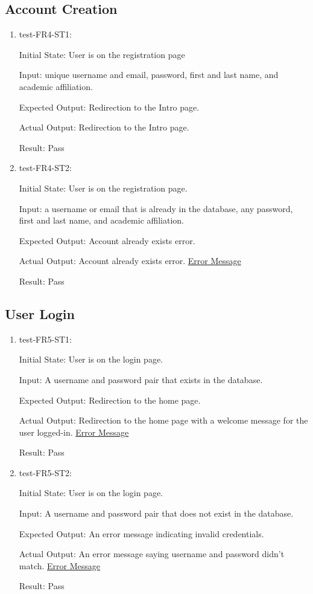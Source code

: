 \documentclass[12pt, titlepage]{article}
\begin{document}
\subsection{Account Creation}
\begin{enumerate}
    \item test-FR4-ST1:\label{test-FR4-ST1}
    
    Initial State: User is on the registration page
    
    Input: unique username and email, password, first and last name, and academic affiliation.
    
    Expected Output: Redirection to the Intro page.
    
    Actual Output: Redirection to the Intro page.
    
    Result: Pass
    \item test-FR4-ST2:\label{test-FR4-ST2}
    
    Initial State: User is on the registration page.
    
    Input: a username or email that is already in the database, any password, first and last name, and academic affiliation.
    
    Expected Output: Account already exists error.
    
    Actual Output: Account already exists error. \href{https://github.com/AidanMariglia/SOCAlgoTestPlatform/blob/main/docs/VnVReport/images/Registration.png}{Error Message}
    
    Result: Pass
\end{enumerate}
\subsection{User Login}
\begin{enumerate}
    \item test-FR5-ST1:\label{test-FR5-ST1}
    
    Initial State: User is on the login page.
    
    Input: A username and password pair that exists in the database.
    
    Expected Output: Redirection to the home page.
    
    Actual Output: Redirection to the home page with a welcome message for the user logged-in. \href{https://github.com/AidanMariglia/SOCAlgoTestPlatform/blob/main/docs/VnVReport/images/Login_success.png}{Error Message}
    
    Result: Pass
    \item test-FR5-ST2:\label{test-FR5-ST2}
    
    Initial State: User is on the login page.
    
    Input: A username and password pair that does not exist in the database.
    
    Expected Output: An error message indicating invalid credentials. 
    
    Actual Output: An error message saying username and password didn't match. \href{https://github.com/AidanMariglia/SOCAlgoTestPlatform/blob/main/docs/VnVReport/images/Login_failed.png}{Error Message}
    
    Result: Pass
\end{enumerate}
\end{document}
